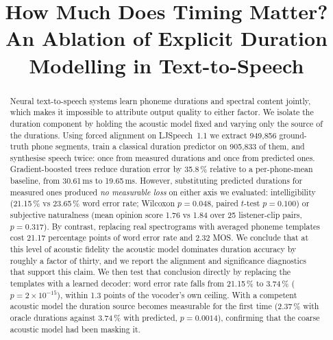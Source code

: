 \documentclass[conference]{IEEEtran}
\begin{document}
\title{How Much Does Timing Matter?\\An Ablation of Explicit Duration Modelling in Text-to-Speech}

\author{
}

\maketitle

\begin{abstract}
Neural text-to-speech systems learn phoneme durations and spectral content jointly, which makes it
impossible to attribute output quality to either factor. We isolate the duration component by
holding the acoustic model fixed and varying only the source of the durations. Using forced
alignment on LJSpeech~1.1 we extract 949{,}856 ground-truth phone segments, train a classical
duration predictor on 905{,}833 of them, and synthesise speech twice: once from measured durations
and once from predicted ones. Gradient-boosted trees reduce duration error by 35.8\,\% relative to
a per-phone-mean baseline, from 30.61\,ms to 19.65\,ms. However, substituting predicted durations
for measured ones produced \emph{no measurable loss} on either axis we evaluated: intelligibility
(21.15\,\% vs 23.65\,\% word error rate; Wilcoxon $p=0.048$, paired $t$-test $p=0.100$) or
subjective naturalness (mean opinion score 1.76 vs 1.84 over 25 listener-clip pairs, $p=0.317$).
By contrast, replacing real spectrograms with averaged phoneme templates cost 21.17 percentage
points of word error rate and 2.32 MOS. We conclude that at
this level of acoustic fidelity the acoustic model dominates duration accuracy by roughly a factor
of thirty, and we report the alignment and significance diagnostics that support this claim.
We then test that conclusion directly by replacing the templates with a learned decoder: word
error rate falls from 21.15\,\% to 3.74\,\% ($p = 2{\times}10^{-15}$), within 1.3 points of the
vocoder's own ceiling. With a competent acoustic model the duration source becomes measurable for
the first time (2.37\,\% with oracle durations against 3.74\,\% with predicted, $p = 0.0014$),
confirming that the coarse acoustic model had been masking it.
\end{abstract}
\end{document}
